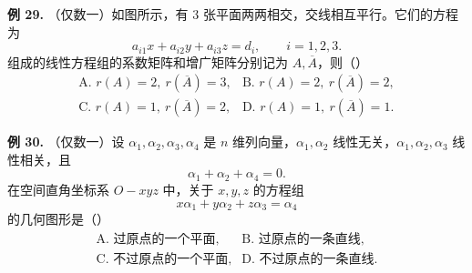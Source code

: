 \begin{problemblock}
\textbf{例 29.} （仅数一）如图所示，有 3 张平面两两相交，交线相互平行。它们的方程为
\[
a_{i1}x+a_{i2}y+a_{i3}z=d_i,\qquad i=1,2,3.
\]
组成的线性方程组的系数矩阵和增广矩阵分别记为 \(A,\overline A\)，则（\quad）
\[
\begin{array}{ll}
\text{A. }r(A)=2,\ r(\overline A)=3,&
\text{B. }r(A)=2,\ r(\overline A)=2,\\
\text{C. }r(A)=1,\ r(\overline A)=2,&
\text{D. }r(A)=1,\ r(\overline A)=1.
\end{array}
\]
\end{problemblock}
\begin{solutionblock}
\end{solutionblock}

\begin{problemblock}
\textbf{例 30.} （仅数一）设 \(\alpha_1,\alpha_2,\alpha_3,\alpha_4\) 是 \(n\) 维列向量，\(\alpha_1,\alpha_2\) 线性无关，\(\alpha_1,\alpha_2,\alpha_3\) 线性相关，且
\[
\alpha_1+\alpha_2+\alpha_4=0.
\]
在空间直角坐标系 \(O-xyz\) 中，关于 \(x,y,z\) 的方程组
\[
x\alpha_1+y\alpha_2+z\alpha_3=\alpha_4
\]
的几何图形是（\quad）
\[
\begin{array}{ll}
\text{A. 过原点的一个平面},& \text{B. 过原点的一条直线},\\
\text{C. 不过原点的一个平面},& \text{D. 不过原点的一条直线}.
\end{array}
\]
\end{problemblock}
\begin{solutionblock}
\end{solutionblock}
